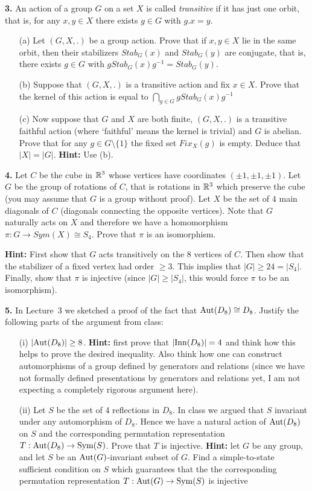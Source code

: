 \documentclass[12pt]{amsart}
\begin{document}
{\bf 3.} An action of a group $G$ on a set $X$ is called {\it transitive} if it has
just one orbit, that is, for any $x,y\in X$ there exists $g\in G$ with $g. x=y$.
\begin{itemize}


\item[(a)] Let $(G,X,.)$ be a group action. Prove that if $x,y\in X$ lie in the same orbit,
then their stabilizers $Stab_G(x)$ and $Stab_G(y)$ are conjugate, that is, there exists $g\in G$
with $g Stab_G(x) g^{-1} = Stab_G(y)$. 

\item[(b)] Suppose that $(G,X,.)$ is a transitive action and fix $x\in X$. Prove that
the kernel of this action is equal to $\bigcap\limits_{g\in G} g Stab_G(x) g^{-1}$

\item[(c)] Now suppose that $G$ and $X$ are both finite, $(G,X,.)$ is a transitive 
faithful action (where `faithful' means the kernel is trivial) and $G$ is abelian. 
Prove that for any $g\in G\setminus \{1\}$ the fixed set $Fix_X(g)$ is empty. 
Deduce that $|X|=|G|$. {\bf Hint:} Use (b).
\end{itemize}

{\bf 4.} Let $C$ be the cube in ${\mathbb R}^3$ whose vertices have coordinates 
$(\pm 1, \pm 1,\pm 1)$. Let $G$ be the group of rotations of $C$, that is rotations in ${\mathbb R}^3$ which preserve the cube (you may assume that $G$ is a group without proof). Let $X$ be the set of $4$ main diagonals of $C$ (diagonals
connecting the opposite vertices). Note that $G$ naturally acts on $X$ and therefore we have a homomorphism $\pi:G\to Sym(X)\cong S_4$. Prove that $\pi$ is an isomorphism.

{\bf Hint: } First show that $G$ acts transitively on the 8 vertices of $C$. Then show that the stabilizer of a fixed vertex had order $\geq 3$. This implies that $|G|\geq 24=|S_4|$. Finally, show that $\pi$ is injective (since $|G|\geq |S_4|$, this would force $\pi$ to be an isomorphism).

\skv
{\bf 5.} In Lecture~3 we sketched a proof of the fact that ${\rm Aut}(D_8)\cong D_8$. Justify the following parts of the argument from class:
\begin{itemize}
\item[(i)] $|{\rm Aut}(D_8)|\geq 8$. {\bf Hint:} first prove that $|{\rm Inn}(D_8)|=4$ and think how this helps to prove the desired inequality. Also think how one can construct automorphisms of a group defined by generators and relations (since we have not formally defined presentations by generators and relations yet, I am not expecting a completely rigorous argument here).
\item[(ii)] Let $S$ be the set of 4 reflections in $D_8$. In class we argued that $S$ invariant under any automorphism of $D_8$. Hence we have a natural action of ${\rm Aut}(D_8)$ on $S$ and the corresponding permutation representation $T:{\rm Aut}(D_8)\to {\rm Sym}(S)$. Prove that $T$ is injective.
{\bf Hint:} let $G$ be any group, and let $S$ be an ${\rm Aut}(G)$-invariant subset of $G$. Find a simple-to-state sufficient condition on $S$
which guarantees that the the corresponding permutation representation $T:{\rm Aut}(G)\to {\rm Sym}(S)$ is injective
\end{itemize}
\end{document}
